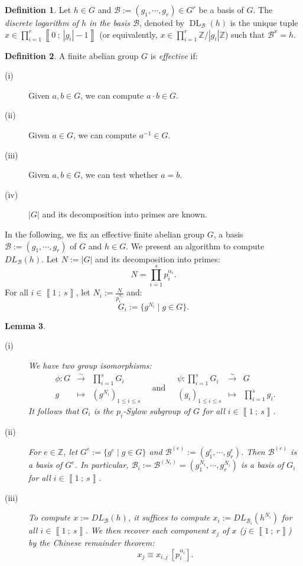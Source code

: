 \documentclass[a4paper,10pt,notitlepage]{report}
\theoremstyle{definition}
\newtheorem{Definition}{Definition}[chapter]
\theoremstyle{plain}
\newtheorem{Lemma}[Definition]{Lemma}
\theoremstyle{definition}
\newcommand{\Z}{\mathbb{Z}}
\newcommand{\m}[1]{\mathcal{#1}}
\renewcommand{\i}[2]{\left\llbracket #1~;~#2\right\rrbracket}
\renewcommand{\(}{\left(}
\renewcommand{\)}{\right)}
\DeclareMathOperator{\DL}{DL}
\begin{document}
\begin{Definition}\label{Definition 5}
Let $h\in G$ and $\m{B}:=(g_1,\cdots, g_r)\in G^r$ be a basis of $G$. The \emph{discrete logarithm of $h$ in the basis $\m{B}$}, denoted by $\DL_{\m{B}}(h)$ is the unique tuple $x\in\prod_{i=1}^r\i{0}{|g_i|-1}$ (or equivalently, $x\in\prod_{i=1}^r\Z/|g_i|\Z$)  such that $\m{B}^x=h$. 
\end{Definition}

\begin{Definition}
A finite abelian group $G$ is \emph{effective} if: 
\begin{description}
\item[(i)] Given $a, b\in G$, we can compute $a\cdot b\in G$.
\item[(ii)] Given $a\in G$, we can compute $a^{-1}\in G$.
\item[(iii)] Given $a, b\in G$, we can test whether $a=b$.
\item[(iv)] $|G|$ and its decomposition into primes are known.
\end{description}
\end{Definition}

In the following, we fix an effective finite abelian group $G$, a basis $\m{B}:=(g_1,\cdots, g_r)$ of $G$ and $h\in G$. We present an algorithm to compute $DL_{\m{B}}(h)$. Let $N:=|G|$ and its decomposition into primes:
\[N=\prod_{i=1}^s p_i^{\alpha_i}.\]
For  all $i\in\i{1}{s}$, let $N_i:=\frac{N}{p_i^{\alpha_i}}$ and:
\[G_i:=\{g^{N_i}\mid g\in G\}.\]

\begin{Lemma}\label{Lemma 11}
\begin{description}
\item[(i)] We have two group isomorphisms:
\[\begin{array}{rcl}
\phi : G&\overset{\sim}{\longrightarrow}&\prod_{i=1}^s G_i\\
g&\longmapsto & (g^{N_i})_{1\leq i\leq s}
\end{array} \quad \mbox{and} \quad \begin{array}{rcl}
\psi : \prod_{i=1}^s G_i &\overset{\sim}{\longrightarrow}& G\\
(g_i)_{1\leq i\leq s} &\longmapsto & \prod_{i=1}^s g_i.
\end{array}\]
It follows that $G_i$ is the $p_i$-Sylow subgroup of $G$ for all $i\in\i{1}{s}$.

\item[(ii)] For $e\in\Z$, let $G^e:=\{g^e\mid g\in G\}$ and $\m{B}^{(e)}:=(g_1^e, \cdots, g_r^e)$. Then $\m{B}^{(e)}$ is a basis of $G^e$.  In particular, $\m{B}_i:=\m{B}^{(N_i)}=(g_1^{N_i},\cdots, g_r^{N_i})$ is a basis of $G_i$ for all $i\in\i{1}{s}$.

\item[(iii)] To compute $x:=DL_{\m{B}}(h)$, it suffices to compute $x_i:=DL_{\m{B}_i}(h^{N_i})$ for all $i\in\i{1}{s}$. We then recover each component $x_j$ of $x$ ($j\in\i{1}{r}$) by the Chinese remainder theorem:
\[x_j\equiv x_{i, j} \ [p_i^{\alpha_i}].\]
\end{description}
\end{Lemma}
\end{document}
